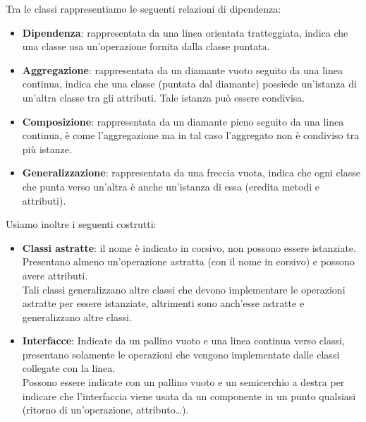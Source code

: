         Tra le classi rappresentiamo le seguenti relazioni di dipendenza:
        \begin{itemize}
            \item \textbf{Dipendenza}: rappresentata da una linea orientata tratteggiata, indica che una classe usa un'operazione fornita dalla classe puntata.
            \item \textbf{Aggregazione}: rappresentata da un diamante vuoto seguito da una linea continua, indica che una classe (puntata dal diamante) possiede un'istanza di un'altra classe tra gli attributi. Tale istanza può essere condivisa.
            \item \textbf{Composizione}: rappresentata da un diamante pieno seguito da una linea continua, è come l'aggregazione ma in tal caso l'aggregato non è condiviso tra più istanze.
            \item \textbf{Generalizzazione}: rappresentata da una freccia vuota, indica che ogni classe che punta verso un'altra è anche un'istanza di essa (eredita metodi e attributi).
        \end{itemize}
        Usiamo inoltre i seguenti costrutti:
            \begin{itemize}
                \item \textbf{Classi astratte}: il nome è indicato in corsivo, non possono essere istanziate. Presentano almeno un'operazione astratta (con il nome in corsivo) e possono avere attributi.\\
                Tali classi generalizzano altre classi che devono implementare le operazioni astratte per essere istanziate, altrimenti sono anch'esse astratte e generalizzano altre classi.
                \item \textbf{Interfacce}: Indicate da un pallino vuoto e una linea continua verso classi, presentano solamente le operazioni che vengono implementate dalle classi collegate con la linea.\\
                Possono essere indicate con un pallino vuoto e un semicerchio a destra per indicare che l'interfaccia viene usata da un componente in un punto qualsiasi (ritorno di un'operazione, attributo\dots).
            \end{itemize}
        
